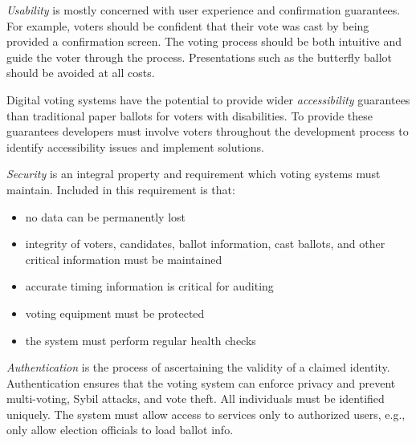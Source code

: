 
\emph{Usability} is mostly concerned with user experience and confirmation
guarantees. For example, voters should be confident that their vote was cast by
being provided a confirmation screen. The voting process should be both
intuitive and guide the voter through the process. Presentations such as the
butterfly ballot should be avoided at all costs.


Digital voting systems have the potential to provide wider \emph{accessibility}
guarantees than traditional paper ballots for voters with disabilities. To
provide these guarantees developers must involve voters throughout the
development process to identify accessibility issues and implement solutions.

\emph{Security} is an integral property and requirement which voting systems
must maintain. Included in this requirement is that:

\begin{itemize}
    \item no data can be permanently lost
    \item integrity of voters, candidates, ballot information, cast ballots, and
      other critical information must be maintained
    \item accurate timing information is critical for auditing
    \item voting equipment must be protected
    \item the system must perform regular health checks
\end{itemize}

\emph{Authentication} is the process of ascertaining the validity of a claimed
identity. Authentication ensures that the voting system can enforce privacy and
prevent multi-voting, Sybil attacks, and vote theft. All individuals must be
identified uniquely. The system must allow access to services only to authorized
users, e.g., only allow election officials to load ballot info.

